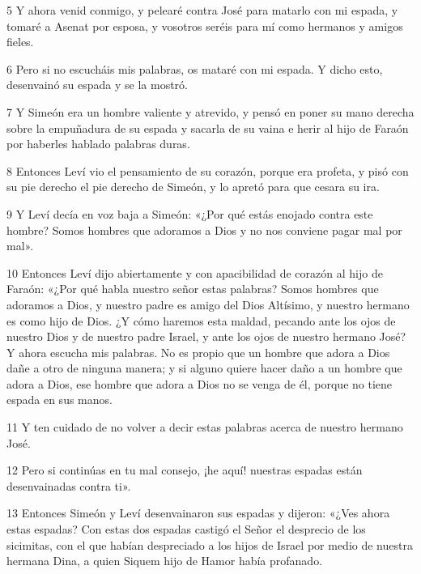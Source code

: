 \par 5 Y ahora venid conmigo, y pelearé contra José para matarlo con mi espada, y tomaré a Asenat por esposa, y vosotros seréis para mí como hermanos y amigos fieles.

\par 6 Pero si no escucháis mis palabras, os mataré con mi espada. Y dicho esto, desenvainó su espada y se la mostró.

\par 7 Y Simeón era un hombre valiente y atrevido, y pensó en poner su mano derecha sobre la empuñadura de su espada y sacarla de su vaina e herir al hijo de Faraón por haberles hablado palabras duras.

\par 8 Entonces Leví vio el pensamiento de su corazón, porque era profeta, y pisó con su pie derecho el pie derecho de Simeón, y lo apretó para que cesara su ira.

\par 9 Y Leví decía en voz baja a Simeón: «¿Por qué estás enojado contra este hombre? Somos hombres que adoramos a Dios y no nos conviene pagar mal por mal».

\par 10 Entonces Leví dijo abiertamente y con apacibilidad de corazón al hijo de Faraón: «¿Por qué habla nuestro señor estas palabras? Somos hombres que adoramos a Dios, y nuestro padre es amigo del Dios Altísimo, y nuestro hermano es como hijo de Dios. ¿Y cómo haremos esta maldad, pecando ante los ojos de nuestro Dios y de nuestro padre Israel, y ante los ojos de nuestro hermano José? Y ahora escucha mis palabras. No es propio que un hombre que adora a Dios dañe a otro de ninguna manera; y si alguno quiere hacer daño a un hombre que adora a Dios, ese hombre que adora a Dios no se venga de él, porque no tiene espada en sus manos.

\par 11 Y ten cuidado de no volver a decir estas palabras acerca de nuestro hermano José.

\par 12 Pero si continúas en tu mal consejo, ¡he aquí! nuestras espadas están desenvainadas contra ti».

\par 13 Entonces Simeón y Leví desenvainaron sus espadas y dijeron: «¿Ves ahora estas espadas? Con estas dos espadas castigó el Señor el desprecio de los sicimitas, con el que habían despreciado a los hijos de Israel por medio de nuestra hermana Dina, a quien Siquem hijo de Hamor había profanado.

